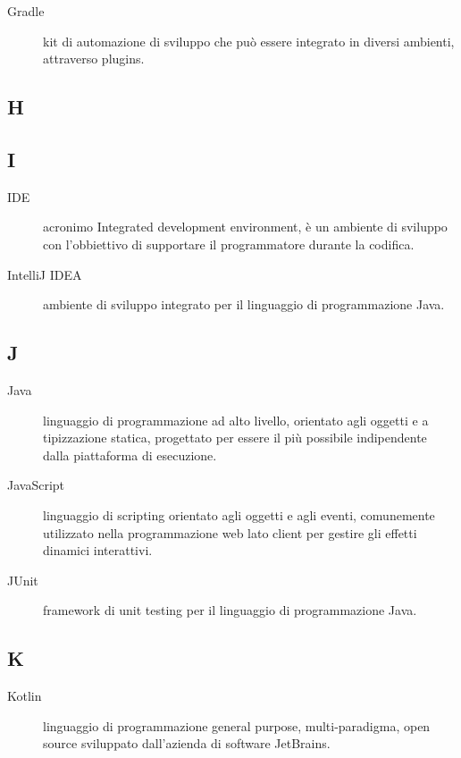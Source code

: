 \documentclass[../../../analisi-dei-requisiti.tex]{subfiles}
\begin{document}
\begin{description}
    \item[Gradle] kit di automazione di sviluppo che può essere integrato in diversi ambienti, attraverso plugins.
\end{description}

\subsection{H}

\subsection{I}

\begin{description}
    \item[IDE] acronimo Integrated development environment, è un ambiente di sviluppo con l'obbiettivo di supportare il programmatore durante la codifica.
    \item[IntelliJ IDEA] ambiente di sviluppo integrato per il linguaggio di programmazione Java.
\end{description}

\subsection{J}

\begin{description}
    \item[Java] linguaggio di programmazione ad alto livello, orientato agli oggetti e a tipizzazione statica, progettato per essere il più possibile indipendente dalla piattaforma di esecuzione.
    \item[JavaScript] linguaggio di scripting orientato agli oggetti e agli eventi, comunemente utilizzato nella programmazione web lato client per gestire gli effetti dinamici interattivi.
    \item[JUnit] framework di unit testing per il linguaggio di programmazione Java.
\end{description}

\subsection{K}

\begin{description}
    \item[Kotlin] linguaggio di programmazione general purpose, multi-paradigma, open source sviluppato dall'azienda di software JetBrains.
\end{description}
\end{document}
